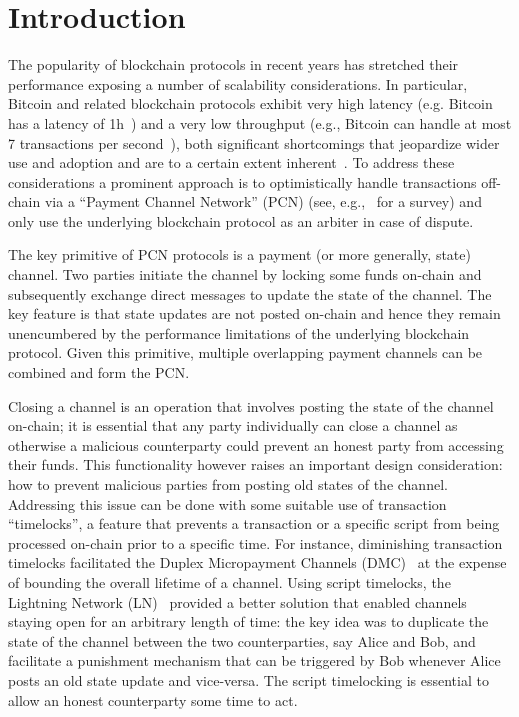 \section{Introduction}
  The popularity of blockchain protocols 
  in recent years has stretched their
  performance  exposing a number of scalability considerations. 
In particular, 
Bitcoin and related blockchain protocols exhibit very high
  latency (e.g. Bitcoin has a latency of 1h~\cite{bitcoin}) 
  and a very low throughput (e.g., Bitcoin can handle at most 7
  transactions per second~\cite{scaling}), 
both significant shortcomings that jeopardize wider 
use and adoption and are to a certain extent inherent~\cite{scaling}.
To address these considerations
a prominent approach is to optimistically handle
  transactions off-chain via a ``Payment Channel Network'' 
  (PCN) (see, e.g.,~\cite{DBLP:conf/fc/GudgeonMRMG20} for a survey)
  and only use the underlying blockchain protocol as an
  arbiter in case of dispute.

The key primitive of PCN protocols is a 
payment (or more generally, state) channel. 
Two parties initiate the channel by locking
some funds on-chain and subsequently
exchange direct messages to update the state of the channel.
The key feature is that state updates are not posted on-chain
and hence they remain unencumbered by the performance limitations
of the underlying blockchain protocol. 
Given this primitive, multiple overlapping payment
channels can be combined and form the PCN. 

Closing a channel is an operation that involves posting the 
state of the channel on-chain; it is essential that any party
individually can close a channel as otherwise a malicious counterparty
could prevent an honest party  from
accessing their funds. This functionality
however raises an important design consideration: how to prevent malicious parties from posting old states of the channel.
%
Addressing this issue can be done with some suitable use
of  transaction ``timelocks'', a feature that prevents a transaction
or a specific script from being processed on-chain
prior to a specific time. 
%
For instance, diminishing transaction timelocks
facilitated the Duplex Micropayment Channels (DMC)~\cite{decker}
at the expense of bounding the overall lifetime of a channel. 
Using script timelocks, the Lightning Network (LN)~\cite{lightning}
provided a better solution that enabled channels staying open
for an arbitrary length of time: the key idea was to duplicate the
state of the channel between the two counterparties, say Alice and Bob, and facilitate a punishment mechanism that can be triggered by Bob whenever Alice posts an old state update and vice-versa. The script timelocking is essential to allow an honest counterparty some time to act.

